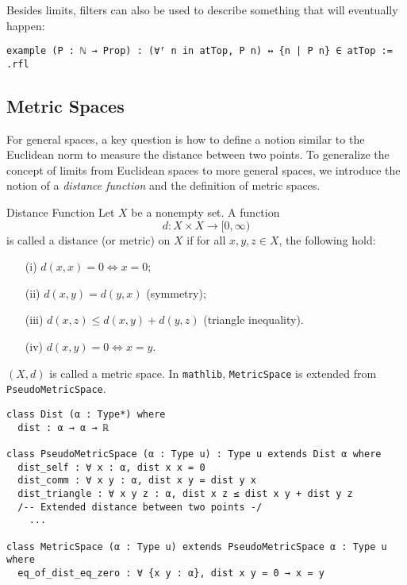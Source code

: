 \documentclass[a4paper]{article}
\begin{document}
Besides limits, filters can also be used to describe something that will eventually happen:
\begin{xmp}{}
\begin{lstlisting}[style = lean]
example (P : ℕ → Prop) : (∀ᶠ n in atTop, P n) ↔ {n | P n} ∈ atTop := .rfl
\end{lstlisting}
\end{xmp}

\subsection{Metric Spaces}

For general spaces, a key question is how to define a notion similar to the Euclidean norm to measure the distance between two points. To generalize the concept of limits from Euclidean spaces to more general spaces, we introduce the notion of a \emph{distance function} and the definition of metric spaces.

\begin{dfn}{Distance Function}  
Let \(X\) be a nonempty set. A function  
\[
d: X \times X \to [0, \infty)
\]  
is called a distance (or metric) on \(X\) if for all \(x, y, z \in X\), the following hold:  
\begin{itemize}  
    \item[(i)] $d(x,x) = 0 \iff x = 0$;
    \item[(ii)] \(d(x,y) = d(y,x)\) (symmetry);  
    \item[(iii)] \(d(x,z) \leq d(x,y) + d(y,z)\) (triangle inequality).  
    \item[(iv)] $d(x,y) = 0 \iff x = y$.
\end{itemize}
$(X,d)$ is called a metric space. In \texttt{mathlib}, \texttt{MetricSpace} is extended from \texttt{PseudoMetricSpace}.
\begin{lstlisting}[style=lean]
class Dist (α : Type*) where
  dist : α → α → ℝ
  
class PseudoMetricSpace (α : Type u) : Type u extends Dist α where
  dist_self : ∀ x : α, dist x x = 0
  dist_comm : ∀ x y : α, dist x y = dist y x
  dist_triangle : ∀ x y z : α, dist x z ≤ dist x y + dist y z
  /-- Extended distance between two points -/
    ...

class MetricSpace (α : Type u) extends PseudoMetricSpace α : Type u where
  eq_of_dist_eq_zero : ∀ {x y : α}, dist x y = 0 → x = y
\end{lstlisting}
\end{dfn}
\end{document}
